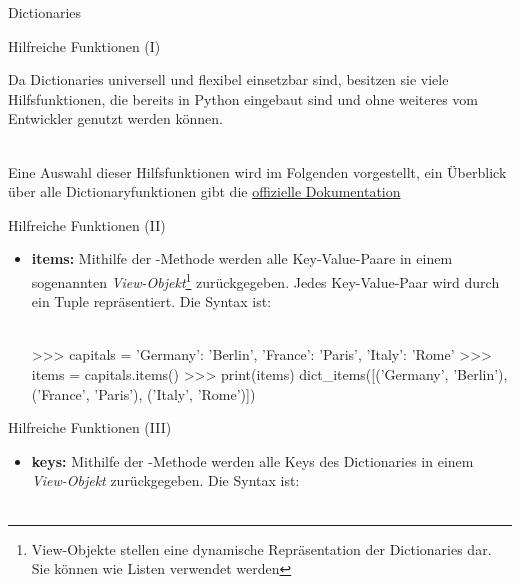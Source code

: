 \begin{subsection}{Dictionaries}
        \begin{frame}[fragile]{Hilfreiche Funktionen (I)}
        
            Da Dictionaries universell und flexibel einsetzbar sind, besitzen sie viele Hilfsfunktionen, die bereits in Python eingebaut sind und ohne weiteres vom Entwickler genutzt werden können.\\~\
            
            Eine Auswahl dieser Hilfsfunktionen wird im Folgenden vorgestellt, ein Überblick über alle Dictionaryfunktionen gibt die \href{https://docs.python.org/3/tutorial/datastructures.html#dictionaries}{offizielle Dokumentation}
                
        \end{frame}
        
        \begin{frame}[fragile]{Hilfreiche Funktionen (II)}
        
            \begin{itemize}
                \item \textbf{items:} Mithilfe der -Methode werden alle Key-Value-Paare in einem sogenannten \textit{View-Objekt}\footnote{View-Objekte stellen eine dynamische Repräsentation der Dictionaries dar. Sie können wie Listen verwendet werden} zurückgegeben. Jedes Key-Value-Paar wird durch ein Tuple repräsentiert. Die Syntax ist: \\~\
                
  
\begin{pyconcode}
>>> capitals = {'Germany': 'Berlin', 'France': 'Paris', 'Italy': 'Rome'}
>>> items = capitals.items()
>>> print(items)
dict_items([('Germany', 'Berlin'), ('France', 'Paris'), ('Italy', 'Rome')])
\end{pyconcode}                
                
            \end{itemize}
                
        \end{frame}
        
        \begin{frame}[fragile]{Hilfreiche Funktionen (III)}
        
            \begin{itemize}
                \item \textbf{keys:} Mithilfe der -Methode werden alle Keys des Dictionaries in einem \textit{View-Objekt} zurückgegeben. Die Syntax ist: \\~\
                

\end{itemize}
\end{frame}
\end{subsection}
